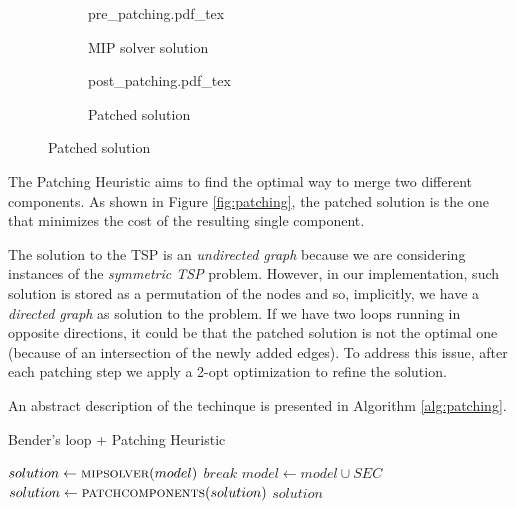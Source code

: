 \documentclass{article}
\begin{document}
\begin{figure}[H]
        \caption{Example of patching}
        \label{fig:patching}
        \centering
        \begin{subfigure}{.5\textwidth}
                \centering
                \def\svgwidth{.7\linewidth}
                {pre_patching.pdf_tex}
                \caption{MIP solver solution}
        \end{subfigure}%
        \begin{subfigure}{.5\textwidth}
                \centering
                \def\svgwidth{.7\linewidth}
                {post_patching.pdf_tex}
                \caption{Patched solution}
        \end{subfigure}
\end{figure}

The Patching Heuristic aims to find the optimal way to merge two different components. As shown
in Figure \ref{fig:patching}, the patched solution is the one that minimizes the cost of the
resulting single component.

The solution to the TSP is an \textit{undirected graph} because
we are considering instances of the \textit{symmetric TSP} problem.
However, in our implementation, such solution is stored as a permutation of the nodes and
so, implicitly, we have a \textit{directed graph} as solution to the problem.
If we have two loops running in opposite directions, it could be that the
patched solution is not the optimal one (because of an intersection of the newly added edges).
To address this issue, after each patching step we apply a 2-opt optimization to refine the solution.

An abstract description of the techinque is presented in Algorithm \ref{alg:patching}.

\begin{algorithm}[ht]
\caption{Bender's loop + Patching Heuristic}
\label{alg:patching}
\begin{algorithmic}
                \State $solution \gets \Call{mipsolver}{model}$
                        \State $break$
                \EndIf
                \State $model \gets model \cup SEC$
                \State $solution \gets \Call{patchcomponents}{solution}$
        \EndWhile
        \State \Return $solution$
\EndProcedure
\end{algorithmic}
\end{algorithm}
\end{document}
